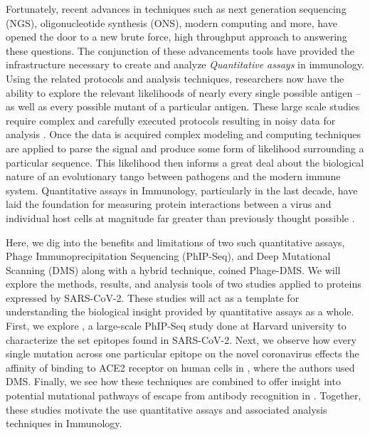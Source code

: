 \documentclass{article}
\begin{document}
Fortunately, recent advances in techniques such as next generation sequencing (NGS), oligonucleotide synthesis (ONS), modern computing and more, have opened the door to a new brute force, high throughput approach to answering these questions.
The conjunction of these  advancements tools have provided the infrastructure necessary to create and analyze \textit{Quantitative assays} in immunology.
Using the related protocols and analysis techniques, researchers now have the ability to explore the relevant likelihoods of nearly every single possible antigen -- as well as every possible mutant of a particular antigen.
These large scale studies require complex and carefully executed protocols resulting in noisy data for analysis \citep{Mohan2018}.
Once the data is acquired complex modeling and computing techniques are applied to parse the signal and produce some form of likelihood surrounding a particular sequence.
This likelihood then informs a great deal about the biological nature of an evolutionary tango between pathogens and the modern immune system.
Quantitative assays in Immunology, particularly in the last decade, have laid the foundation for measuring protein interactions between a virus and individual host cells at magnitude far greater than previously thought possible \citep{Fowler2014, Bloom2014}.


Here, we dig into the benefits and limitations of two such quantitative assays, Phage Immunoprecipitation Sequencing (PhIP-Seq), and Deep Mutational Scanning (DMS) along with a hybrid technique, coined Phage-DMS. 
We will explore the methods, results, and analysis tools of two studies applied to proteins expressed by SARS-CoV-2.
These studies will act as a template for understanding the biological insight provided by quantitative assays as a whole.
First, we explore \citet{Shrock2020}, a large-scale PhIP-Seq study done at Harvard university to characterize the set epitopes found in SARS-CoV-2.
Next, we observe how every single mutation across one particular epitope on the novel coronavirus effects the affinity of binding to ACE2 receptor on human cells in \cite{Starr2020}, where the authors used DMS.
Finally, we see how these techniques are combined to offer insight into potential mutational pathways of escape from antibody recognition in \citet{Garrett2020}.
Together, these studies motivate the use quantitative assays and associated analysis techniques in Immunology.
\end{document}
